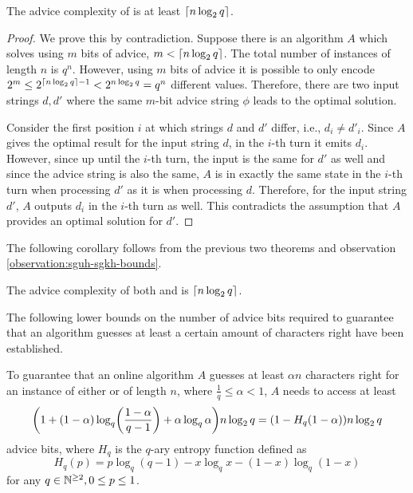 \begin{theorem}\label{theorem:sgkh-lower}
    The advice complexity of  is at least $\lceil n \log_2 q\rceil$.
\end{theorem}

\begin{proof}
    We prove this by contradiction. Suppose there is an algorithm $A$
    which solves  using $m$ bits of advice, $m < \lceil n \log_2 q\rceil$.
    The total number of instances of length $n$ is $q^n$. However, using
    $m$ bits of advice it is possible to only encode $2^m \leq 2^{\lceil n
    \log_2 q\rceil - 1} < 2^{n \log_2 q} = q^n$ different values. Therefore, there
    are two input strings $d, d'$ where the same $m$-bit advice string
    $\phi$ leads to the optimal solution.

    Consider the first position $i$ at which strings $d$ and $d'$ differ,
    i.e., $d_i \not= d'_i$. Since $A$ gives the optimal result for the
    input string $d$, in the $i$-th turn it emits $d_i$. However, since up
    until the $i$-th turn, the input is the same for $d'$ as well and
    since the advice string is also the same, $A$ is in exactly the same
    state in the $i$-th turn when processing $d'$ as it is when processing
    $d$. Therefore, for the input string $d'$, $A$ outputs $d_i$ in the
    $i$-th turn as well. This contradicts the assumption that $A$ provides
    an optimal solution for $d'$.
\end{proof}

The following corollary follows from the previous two theorems and
observation \ref{observation:sguh-sgkh-bounds}.

\begin{corollary}
    The advice complexity of both  and  is $\lceil n \log_2
    q\rceil$.
\end{corollary}

The following lower bounds on the number of advice bits required to
guarantee that an algorithm guesses at least a certain amount of
characters right have been established.

\begin{theorem}\label{theorem:sguh-lower-ratio}\label{theorem:sgkh-lower-ratio}
    To guarantee that an online algorithm $A$ guesses at least $\alpha{}n$
    characters right for an instance of either  or  of
    length $n$, where $\frac{1}{q} \leq \alpha < 1$, $A$ needs to access at
    least
    $$
        \paren*{1 + (1 - \alpha)\log_q\paren*{\frac{1 - \alpha}{q - 1}} +
        \alpha\log_q\alpha} n\lg{}q
        =
        (1 - H_q (1 - \alpha)) n\lg{}q
    $$
    advice bits, where $H_q$ is the $q$-ary entropy function defined as
    $$
        H_q(p) = p \log_q(q - 1) - x\log_qx - (1-x)\log_q(1-x)
    $$
    for any $q \in \mathbb{N}^{\geq2}, 0 \leq p \leq 1$.
\end{theorem}

